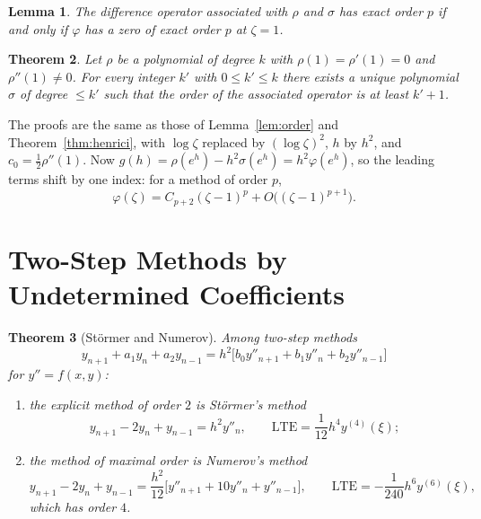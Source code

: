 \documentclass[11pt,a4paper]{article}
\numberwithin{equation}{section}
\theoremstyle{spacedplain}
\newtheorem{theorem}{Theorem}[section]
\newtheorem{lemma}[theorem]{Lemma}
\theoremstyle{spaceddefinition}
\theoremstyle{spacedremark}
\begin{document}
\begin{lemma}
The difference operator associated with \(\rho\) and \(\sigma\) has
exact order \(p\) if and only if \(\varphi\) has a zero of exact order
\(p\) at \(\zeta=1\).
\end{lemma}

\begin{theorem}
Let \(\rho\) be a polynomial of degree \(k\) with
\(\rho(1)=\rho'(1)=0\) and \(\rho''(1)\neq 0\).  For every integer
\(k'\) with \(0\le k'\le k\) there exists a unique polynomial
\(\sigma\) of degree \(\le k'\) such that the order of the associated
operator is at least \(k'+1\).
\end{theorem}

The proofs are the same as those of Lemma~\ref{lem:order} and
Theorem~\ref{thm:henrici}, with \(\log\zeta\) replaced by
\((\log\zeta)^2\), \(h\) by \(h^2\), and \(c_0=\frac12\rho''(1)\).  Now
\(g(h)=\rho(e^h)-h^2\sigma(e^h)=h^2\varphi(e^h)\), so the leading terms
shift by one index: for a method of order \(p\),
\[
  \varphi(\zeta)=C_{p+2}(\zeta-1)^p+O\bigl((\zeta-1)^{p+1}\bigr).
\]

\section{Two-Step Methods by Undetermined Coefficients}

\begin{keybox}
\begin{theorem}[Störmer and Numerov]\label{thm:numerov}
Among two-step methods
\begin{equation}\label{eq:2step}
  y_{n+1}+a_1y_n+a_2y_{n-1}
  =h^2\bigl[b_0y''_{n+1}+b_1y''_n+b_2y''_{n-1}\bigr]
\end{equation}
for \(y''=f(x,y)\):
\begin{enumerate}[label=(\alph*)]
  \item the explicit method of order \(2\) is \emph{Störmer's method}
    \[
      y_{n+1}-2y_n+y_{n-1}=h^2y''_n,
      \qquad \text{LTE}=\frac1{12}h^4y^{(4)}(\xi);
    \]
  \item the method of maximal order is \emph{Numerov's method}
    \[
      y_{n+1}-2y_n+y_{n-1}
      =\frac{h^2}{12}\bigl[y''_{n+1}+10y''_n+y''_{n-1}\bigr],
      \qquad \text{LTE}=-\frac1{240}h^6y^{(6)}(\xi),
    \]
    which has order \(4\).
\end{enumerate}
\end{theorem}
\end{keybox}
\end{document}
